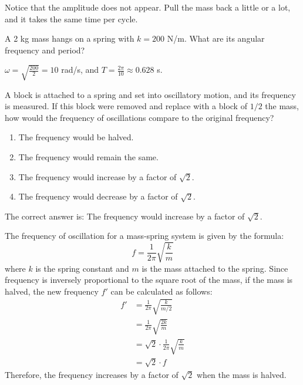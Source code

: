 Notice that the amplitude does not appear. Pull the mass back a little
or a lot, and it takes the same time per cycle.

\begin{Worked}
\begin{Problem}
A 2 kg mass hangs on a spring with $k = 200$ N/m.
What are its angular frequency and period?
\end{Problem}
\begin{Solution}
$\omega = \sqrt{\frac{200}{2}} = 10$ rad/s, and
$T = \frac{2\pi}{10} \approx 0.628$ s.
\end{Solution}
\end{Worked}

\begin{Exercise}
	[label={ex:springmassfreq}, title={Mass-Spring Frequency Change}] A block is
	attached to a spring and set into oscillatory motion, and its frequency is measured.
	If this block were removed and replace with a block of $1/2$ the mass, how would
	the frequency of oscillations compare to the original frequency?
	\begin{enumerate}[]
		\item The frequency would be halved.

		\item The frequency would remain the same.

		\item The frequency would increase by a factor of $\sqrt{2}$.

		\item The frequency would decrease by a factor of $\sqrt{2}$.
	\end{enumerate}
\end{Exercise}

\begin{Answer}
	[ref={ex:springmassfreq}] The correct answer is: The frequency would increase
	by a factor of $\sqrt{2}$.

	The frequency of oscillation for a mass-spring system is given by the formula:
	\[
		f = \frac{1}{2\pi}\sqrt{\frac{k}{m}}
	\]
	where $k$ is the spring constant and $m$ is the mass attached to the spring.
	Since frequency is inversely proportional to the square root of the mass, if the
	mass is halved, the new frequency $f'$ can be calculated as follows:
	\begin{align*}
		f' & = \frac{1}{2\pi}\sqrt{\frac{k}{m/2}}             \\
		   & = \frac{1}{2\pi}\sqrt{\frac{2k}{m}}              \\
		   & = \sqrt{2}\cdot \frac{1}{2\pi}\sqrt{\frac{k}{m}} \\
		   & = \sqrt{2}\cdot f
	\end{align*}
	Therefore, the frequency increases by a factor of $\sqrt{2}$ when the
	mass is halved.
\end{Answer}

